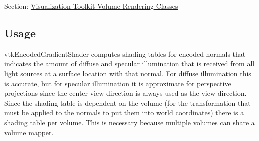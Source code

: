 Section\-: \hyperlink{sec_vtkvolumerendering}{Visualization Toolkit Volume Rendering Classes} \hypertarget{vtkwidgets_vtkxyplotwidget_Usage}{}\subsection{Usage}\label{vtkwidgets_vtkxyplotwidget_Usage}
vtk\-Encoded\-Gradient\-Shader computes shading tables for encoded normals that indicates the amount of diffuse and specular illumination that is received from all light sources at a surface location with that normal. For diffuse illumination this is accurate, but for specular illumination it is approximate for perspective projections since the center view direction is always used as the view direction. Since the shading table is dependent on the volume (for the transformation that must be applied to the normals to put them into world coordinates) there is a shading table per volume. This is necessary because multiple volumes can share a volume mapper.


